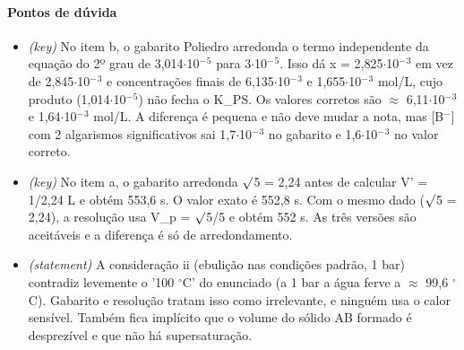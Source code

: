 \documentclass{article}%
\begin{document}
\paragraph{Pontos de dúvida}%
\begin{itemize}%
\item%
\textit{(key)} No item b, o gabarito Poliedro arredonda o termo independente da equação do 2º grau de 3,014$\cdot$10$^{-}$$^{5}$ para 3$\cdot$10$^{-}$$^{5}$. Isso dá x = 2,825$\cdot$10$^{-}$$^3$ em vez de 2,845$\cdot$10$^{-}$$^3$ e concentrações finais de 6,135$\cdot$10$^{-}$$^3$ e 1,655$\cdot$10$^{-}$$^3$ mol/L, cujo produto (1,014$\cdot$10$^{-}$$^{5}$) não fecha o K\_PS. Os valores corretos são $\approx$ 6,11$\cdot$10$^{-}$$^3$ e 1,64$\cdot$10$^{-}$$^3$ mol/L. A diferença é pequena e não deve mudar a nota, mas {[}B$^{-}${]} com 2 algarismos significativos sai 1,7$\cdot$10$^{-}$$^3$ no gabarito e 1,6$\cdot$10$^{-}$$^3$ no valor correto.%
\item%
\textit{(key)} No item a, o gabarito arredonda $\surd$5 = 2,24 antes de calcular V' = 1/2,24 L e obtém 553,6 s. O valor exato é 552,8 s. Com o mesmo dado ($\surd$5 = 2,24), a resolução usa V\_p = $\surd$5/5 e obtém 552 s. As três versões são aceitáveis e a diferença é só de arredondamento.%
\item%
\textit{(statement)} A consideração ii (ebulição nas condições padrão, 1 bar) contradiz levemente o '100 $^\circ$C' do enunciado (a 1 bar a água ferve a $\approx$ 99,6 $^\circ$C). Gabarito e resolução tratam isso como irrelevante, e ninguém usa o calor sensível. Também fica implícito que o volume do sólido AB formado é desprezível e que não há supersaturação.%
\end{itemize}%
\end{document}
